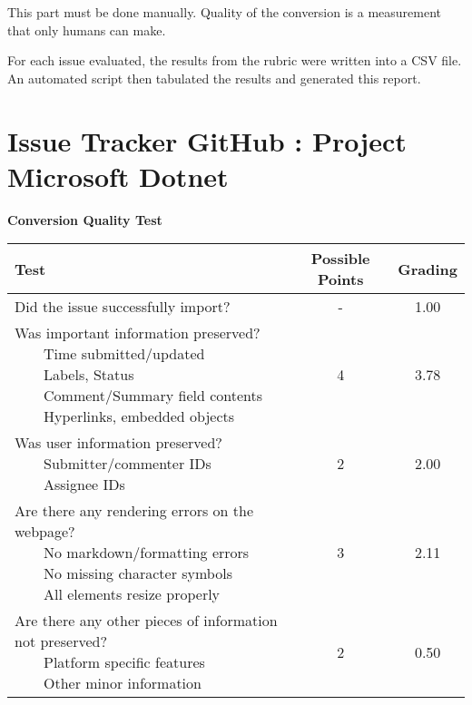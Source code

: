 \documentclass{article}
\newcommand{\tabitem}{~~\llap{\textbullet}~~}
\begin{document}
	This part must be done manually. Quality of the conversion is a measurement that only humans can make.
	
	For each issue evaluated, the results from the rubric were written into a CSV file. 
	An automated script then tabulated the results and generated this report.
	
\pagebreak\section{Issue Tracker GitHub : Project Microsoft Dotnet}
\textbf{Conversion Quality Test}\\
\begin{adjustbox}{center}
	\renewcommand{\arraystretch}{1.5}
	\begin{tabular}{ p{6cm} | c | c }
		Test & Possible Points & Grading \\ \hline
		Did the issue successfully import? & - & 1.00 \\
		\hline
		\makecell[l]{
			Was important information preserved? \\
			\tabitem Time submitted/updated \\
			\tabitem Labels, Status \\
			\tabitem Comment/Summary field contents \\
			\tabitem Hyperlinks, embedded objects}
		& 4 & 3.78 \\
		\hline
		\makecell[l]{
			Was user information preserved? \\
			\tabitem Submitter/commenter IDs \\
			\tabitem Assignee IDs
		} & 2 & 2.00 \\
		\hline
		\makecell[{{p{6cm}}}]{
			Are there any rendering errors on the webpage? \\
			\tabitem No markdown/formatting errors \\
			\tabitem No missing character symbols \\
			\tabitem All elements resize properly
		} & 3 & 2.11 \\
		\hline
		\makecell[{{p{6cm}}}]{
			Are there any other pieces of information not preserved? \\
			\tabitem Platform specific features \\
			\tabitem Other minor information
		} & 2 & 0.50 \\
	\end{tabular}
\end{adjustbox}
\\
\end{document}
